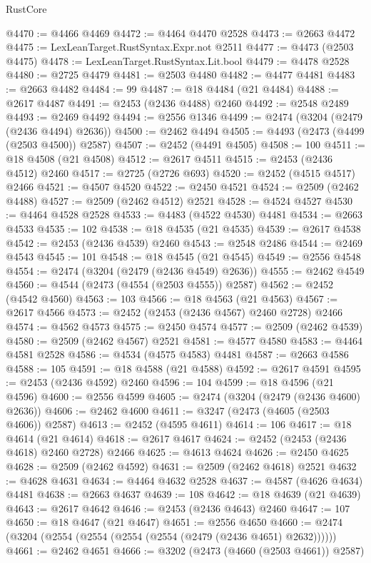 \begin{lexlean}{RustCore}
\begin{coremodule}
@4470 := @4466 @4469
@4472 := @4464 @4470 @2528
@4473 := @2663 @4472
@4475 := LexLeanTarget.RustSyntax.Expr.not @2511
@4477 := @4473 (@2503 @4475)
@4478 := LexLeanTarget.RustSyntax.Lit.bool
@4479 := @4478 @2528
@4480 := @2725 @4479
@4481 := @2503 @4480
@4482 := @4477 @4481
@4483 := @2663 @4482
@4484 := 99
@4487 := @18 @4484 (@21 @4484)
@4488 := @2617 @4487
@4491 := @2453 (@2436 @4488) @2460
@4492 := @2548 @2489
@4493 := @2469 @4492
@4494 := @2556 @1346
@4499 := @2474 (@3204 (@2479 (@2436 @4494) @2636))
@4500 := @2462 @4494
@4505 := @4493 (@2473 (@4499 (@2503 @4500)) @2587)
@4507 := @2452 (@4491 @4505)
@4508 := 100
@4511 := @18 @4508 (@21 @4508)
@4512 := @2617 @4511
@4515 := @2453 (@2436 @4512) @2460
@4517 := @2725 (@2726 @693)
@4520 := @2452 (@4515 @4517) @2466
@4521 := @4507 @4520
@4522 := @2450 @4521
@4524 := @2509 (@2462 @4488)
@4527 := @2509 (@2462 @4512) @2521
@4528 := @4524 @4527
@4530 := @4464 @4528 @2528
@4533 := @4483 (@4522 @4530) @4481
@4534 := @2663 @4533
@4535 := 102
@4538 := @18 @4535 (@21 @4535)
@4539 := @2617 @4538
@4542 := @2453 (@2436 @4539) @2460
@4543 := @2548 @2486
@4544 := @2469 @4543
@4545 := 101
@4548 := @18 @4545 (@21 @4545)
@4549 := @2556 @4548
@4554 := @2474 (@3204 (@2479 (@2436 @4549) @2636))
@4555 := @2462 @4549
@4560 := @4544 (@2473 (@4554 (@2503 @4555)) @2587)
@4562 := @2452 (@4542 @4560)
@4563 := 103
@4566 := @18 @4563 (@21 @4563)
@4567 := @2617 @4566
@4573 := @2452 (@2453 (@2436 @4567) @2460 @2728) @2466
@4574 := @4562 @4573
@4575 := @2450 @4574
@4577 := @2509 (@2462 @4539)
@4580 := @2509 (@2462 @4567) @2521
@4581 := @4577 @4580
@4583 := @4464 @4581 @2528
@4586 := @4534 (@4575 @4583) @4481
@4587 := @2663 @4586
@4588 := 105
@4591 := @18 @4588 (@21 @4588)
@4592 := @2617 @4591
@4595 := @2453 (@2436 @4592) @2460
@4596 := 104
@4599 := @18 @4596 (@21 @4596)
@4600 := @2556 @4599
@4605 := @2474 (@3204 (@2479 (@2436 @4600) @2636))
@4606 := @2462 @4600
@4611 := @3247 (@2473 (@4605 (@2503 @4606)) @2587)
@4613 := @2452 (@4595 @4611)
@4614 := 106
@4617 := @18 @4614 (@21 @4614)
@4618 := @2617 @4617
@4624 := @2452 (@2453 (@2436 @4618) @2460 @2728) @2466
@4625 := @4613 @4624
@4626 := @2450 @4625
@4628 := @2509 (@2462 @4592)
@4631 := @2509 (@2462 @4618) @2521
@4632 := @4628 @4631
@4634 := @4464 @4632 @2528
@4637 := @4587 (@4626 @4634) @4481
@4638 := @2663 @4637
@4639 := 108
@4642 := @18 @4639 (@21 @4639)
@4643 := @2617 @4642
@4646 := @2453 (@2436 @4643) @2460
@4647 := 107
@4650 := @18 @4647 (@21 @4647)
@4651 := @2556 @4650
@4660 := @2474 (@3204 (@2554 (@2554 (@2554 (@2554 (@2479 (@2436 @4651) @2632))))))
@4661 := @2462 @4651
@4666 := @3202 (@2473 (@4660 (@2503 @4661)) @2587)

\end{coremodule}
\end{lexlean}
